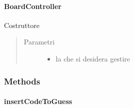 \documentclass[letterpaper,10pt,italian,openany,oneside]{sphinxmanual}
\begin{document}
\paragraph{BoardController}
\label{\detokenize{test/it/unicam/cs/pa/mastermind/gamecore/BoardController:id1}}

\begin{fulllineitems}
\label{\detokenize{test/it/unicam/cs/pa/mastermind/gamecore/BoardController:it.unicam.cs.pa.mastermind.gamecore.BoardController.BoardController(BoardModel)}}
Costruttore
\begin{quote}\begin{description}
\item[{Parametri}] \leavevmode\begin{itemize}
\item {} 
 \textendash{} la  che si desidera gestire

\end{itemize}

\end{description}\end{quote}

\end{fulllineitems}



\subsubsection{Methods}
\label{\detokenize{test/it/unicam/cs/pa/mastermind/gamecore/BoardController:methods}}

\paragraph{insertCodeToGuess}
\label{\detokenize{test/it/unicam/cs/pa/mastermind/gamecore/BoardController:insertcodetoguess}}
\end{document}
